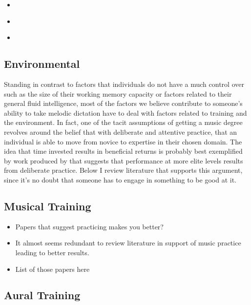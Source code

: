 \documentclass[]{book}
\providecommand{\tightlist}{%
  \setlength{\itemsep}{0pt}\setlength{\parskip}{0pt}}
\theoremstyle{definition}
\theoremstyle{definition}
\theoremstyle{definition}
\theoremstyle{remark}
\begin{document}
\begin{itemize}
\tightlist
\item
  \citep{corrigallMusicTrainingCognition2013}
\item
  \citep{corrigallMusicTrainingCognition2013a}
\item
  \citep{swaminathanRevisitingAssociationMusic2017}
\end{itemize}

\hypertarget{environmental}{%
\subsection{Environmental}\label{environmental}}

Standing in contrast to factors that individuals do not have a much
control over such as the size of their working memory capacity or
factors related to their general fluid intelligence, most of the factors
we believe contribute to someone's ability to take melodic dictation
have to deal with factors related to training and the environment. In
fact, one of the tacit assumptions of getting a music degree revolves
around the belief that with deliberate and attentive practice, that an
individual is able to move from novice to expertise in their chosen
domain. The idea that time invested results in beneficial returns is
probably best exemplified by work produced by
\citet{ericssonRoleDeliberatePractice1993} that suggests that
performance at more elite levels results from deliberate practice. Below
I review literature that supports this argument, since it's no doubt
that someone has to engage in something to be good at it.

\hypertarget{musical-training}{%
\subsection{Musical Training}\label{musical-training}}

\begin{itemize}
\item
  Papers that suggest practicing makes you better?
\item
  It almost seems redundant to review literature in support of music
  practice leading to better results.
\item
  List of those papers here
\end{itemize}

\hypertarget{aural-training}{%
\subsection{Aural Training}\label{aural-training}}
\end{document}
